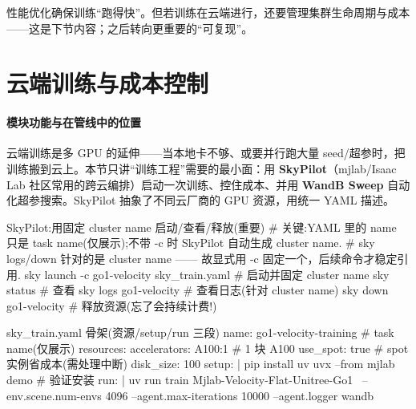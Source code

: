性能优化确保训练“跑得快”。但若训练在云端进行，还要管理集群生命周期与成本——这是下节内容；之后转向更重要的“可复现”。

\section{云端训练与成本控制}
\label{sec:rlmc-ls-cloud}

\paragraph{\texorpdfstring{ 模块功能与在管线中的位置}{1 模块功能与在管线中的位置}}云端训练是多 GPU 的延伸——当本地卡不够、或要并行跑大量 seed/超参时，把训练搬到云上。本节只讲“训练工程”需要的最小面：用 \textbf{SkyPilot}（mjlab/Isaac Lab 社区常用的跨云编排）启动一次训练、控住成本、并用 \textbf{WandB Sweep} 自动化超参搜索。SkyPilot 抽象了不同云厂商的 GPU 资源，用统一 YAML 描述。

\begin{codebox}[bash]{SkyPilot:用固定 cluster name 启动/查看/释放(重要)}
# 关键:YAML 里的 name 只是 task name(仅展示);不带 -c 时 SkyPilot 自动生成 cluster name.
# sky logs/down 针对的是 cluster name —— 故显式用 -c 固定一个，后续命令才稳定引用.
sky launch -c go1-velocity sky_train.yaml        # 启动并固定 cluster name
sky status                                        # 查看
sky logs go1-velocity                             # 查看日志(针对 cluster name)
sky down go1-velocity                             # 释放资源(忘了会持续计费!)
\end{codebox}

\begin{codebox}[text]{sky\_train.yaml 骨架(资源/setup/run 三段)}
name: go1-velocity-training        # task name(仅展示)
resources:
  accelerators: A100:1             # 1 块 A100
  use_spot: true                   # spot 实例省成本(需处理中断)
  disk_size: 100
setup: |
  pip install uv
  uvx --from mjlab demo            # 验证安装
run: |
  uv run train Mjlab-Velocity-Flat-Unitree-Go1 \
    --env.scene.num-envs 4096 --agent.max-iterations 10000 --agent.logger wandb
\end{codebox}


